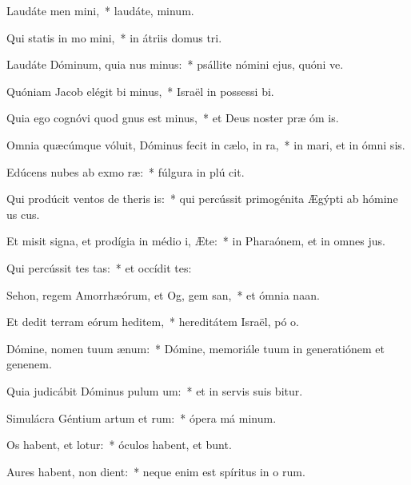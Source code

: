 \item Laudáte men mini,~* laudáte,  minum.
\item Qui statis in mo mini,~* in átriis domus  tri.
\item Laudáte Dóminum, quia nus minus:~* psállite nómini ejus, quóni ve.
\item Quóniam Jacob elégit bi minus,~* Israël in possessi bi.
\item Quia ego cognóvi quod gnus est minus,~* et Deus noster præ óm is.
\item Omnia quæcúmque vóluit, Dóminus fecit in cælo,  in ra,~* in mari, et in ómni sis.
\item Edúcens nubes ab exmo ræ:~* fúlgura in plú cit.
\item Qui prodúcit ventos de theris is:~* qui percússit primogénita Ægýpti ab hómine us  cus.
\item Et misit signa, et prodígia in médio i, Æte:~* in Pharaónem, et in omnes  jus.
\item Qui percússit tes tas:~* et occídit  tes:
\item Sehon, regem Amorrhæórum, et Og, gem san,~* et ómnia  naan.
\item Et dedit terram eórum heditem,~* hereditátem Israël, pó o.
\item Dómine, nomen tuum  ænum:~* Dómine, memoriále tuum in generatiónem et genenem.
\item Quia judicábit Dóminus pulum um:~* et in servis suis bitur.
\item Simulácra Géntium artum et rum:~* ópera má minum.
\item Os habent, et  lotur:~* óculos habent, et  bunt.
\item Aures habent,  non dient:~* neque enim est spíritus in o rum.
